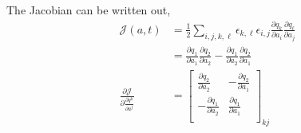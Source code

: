 \documentclass[10pt,a4paper,final]{article}
\begin{document}
The Jacobian can be written out,
\begin{align*}
\mathcal{J}(a, t) &= \frac{1}{2} \sum_{i,j,k,\ell} \epsilon_{k, \ell} \epsilon_{i,j}  \frac{\partial q_k}{\partial a_i} \frac{\partial q_\ell}{\partial a_j} \\
  &= \frac{\partial q_1}{\partial a_1} \frac{\partial q_2}{\partial a_2} - \frac{\partial q_1}{\partial a_2} \frac{\partial q_2}{\partial a_1} \\
\frac{\partial \mathcal{J}}{\partial \frac{\partial q^k}{\partial a^j}} &= 
\left[ \begin{matrix}
 \frac{\partial q_2}{\partial a_2} & -\frac{\partial q_2}{\partial a_1} \\
 -\frac{\partial q_1}{\partial a_2} & \frac{\partial q_1}{\partial a_1} \\
\end{matrix} \right]_{kj}
\end{align*}
\end{document}
